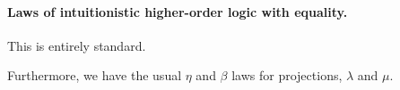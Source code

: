 \paragraph{Laws of intuitionistic higher-order logic with equality.}
This is entirely standard.
Furthermore, we have the usual $\eta$ and $\beta$ laws for projections, $\lambda$ and $\mu$.


